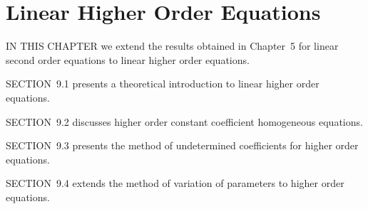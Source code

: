 \chapter{Linear Higher Order Equations}

\noindent
IN THIS CHAPTER we extend the results obtained in Chapter~5 for linear second order equations to linear higher order equations.

\medskip
\noindent
SECTION~9.1 presents a theoretical introduction to linear higher order equations.

\medskip
\noindent
SECTION~9.2 discusses higher order constant coefficient homogeneous equations.

\medskip
\noindent
SECTION~9.3 presents the method of undetermined coefficients for higher order equations.

\medskip
\noindent
SECTION~9.4 extends the method of variation of parameters to higher order equations.

\newpage








